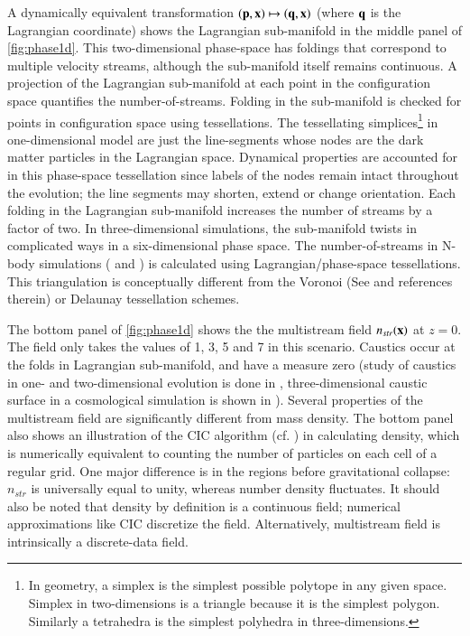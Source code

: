  
A dynamically equivalent transformation $(\bf{p}, \bf{x}) \mapsto (\bf{q}, \bf{x}) $ (where $\bf{q}$ is the Lagrangian coordinate) shows the Lagrangian sub-manifold in the middle panel of \autoref{fig:phase1d}. This two-dimensional phase-space has foldings that correspond to multiple velocity streams, although the sub-manifold itself remains continuous. A projection of the Lagrangian sub-manifold at each point in the configuration space quantifies the number-of-streams. Folding in the sub-manifold is checked for points in configuration space using tessellations. The tessellating simplices\footnote{In geometry, a simplex is the simplest possible polytope in any given space. Simplex in two-dimensions is a triangle because it is the simplest polygon. Similarly a tetrahedra is the simplest polyhedra in three-dimensions.} in one-dimensional model are just the line-segments whose nodes are the dark matter particles in the Lagrangian space. Dynamical properties are accounted for in this phase-space tessellation since labels of the nodes remain intact throughout the evolution; the line segments may shorten, extend or change orientation. Each folding in the Lagrangian sub-manifold increases the number of streams by a factor of two. In three-dimensional simulations, the sub-manifold twists in complicated ways in a six-dimensional phase space. The number-of-streams in N-body simulations (\citealt{Shandarin2012} and \citealt{Abel2012}) is calculated using Lagrangian/phase-space tessellations. This triangulation is conceptually different from the Voronoi (See \citealt{Schaap2000} and references therein) or Delaunay \citep{Icke1991} tessellation schemes. 

The bottom panel of \autoref{fig:phase1d} shows the the multistream field $n_{str}(\bf{x})$ at $z = 0$. The field only takes the values of 1, 3, 5 and 7 in this scenario. Caustics occur at the folds in Lagrangian sub-manifold, and have a measure zero (study of caustics in one- and  two-dimensional evolution is done in \cite{Hidding2014}, three-dimensional caustic surface in a cosmological simulation is shown in \cite{Ramachandra2017} ). Several properties of the multistream field are significantly different from mass density. The bottom panel also shows an illustration of the CIC algorithm (cf. \citealt{Hockney1988}) in calculating density, which is numerically equivalent to counting the number of particles on each cell of a regular grid. One major difference is in the regions before gravitational collapse: $n_{str}$ is universally equal to unity, whereas number density fluctuates. It should also be noted that density by definition is a continuous field; numerical approximations like CIC discretize the field. Alternatively, multistream field is intrinsically a discrete-data field.  




